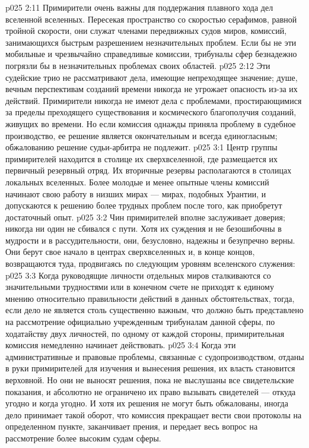 \vs p025 2:11 \pc Примирители очень важны для поддержания плавного хода дел вселенной вселенных. Пересекая пространство со скоростью серафимов, равной тройной скорости, они служат членами передвижных судов миров, комиссий, занимающихся быстрым разрешением незначительных проблем. Если бы не эти мобильные и чрезвычайно справедливые комиссии, трибуналы сфер безнадежно погрязли бы в незначительных проблемах своих областей.
\vs p025 2:12 Эти судейские трио не рассматривают дела, имеющие непреходящее значение; душе, вечным перспективам созданий времени никогда не угрожает опасность из\hyp{}за их действий. Примирители никогда не имеют дела с проблемами, простирающимися за пределы преходящего существования и космического благополучия созданий, живущих во времени. Но если комиссия однажды приняла проблему в судебное производство, ее решение является окончательным и всегда единогласным; обжалованию решение судьи\hyp{}арбитра не подлежит.
\vs p025 3:1 Центр группы примирителей находится в столице их сверхвселенной, где размещается их первичный резервный отряд. Их вторичные резервы располагаются в столицах локальных вселенных. Более молодые и менее опытные члены комиссий начинают свою работу в низших мирах --- мирах, подобных Урантии, и допускаются к решению более трудных проблем после того, как приобретут достаточный опыт.
\vs p025 3:2 Чин примирителей вполне заслуживает доверия; никогда ни один не сбивался с пути. Хотя их суждения и не безошибочны в мудрости и в рассудительности, они, безусловно, надежны и безупречно верны. Они берут свое начало в центрах сверхвселенных и, в конце концов, возвращаются туда, продвигаясь по следующим уровням вселенского служения:
\vs p025 3:3 \pc {}\bibnobreakspace {} Когда руководящие личности отдельных миров сталкиваются со значительными трудностями или в конечном счете не приходят к единому мнению относительно правильности действий в данных обстоятельствах, тогда, если дело не является столь существенно важным, что должно быть представлено на рассмотрение официально учрежденным трибуналам данной сферы, по ходатайству двух личностей, по одному от каждой стороны, примирительная комиссия немедленно начинает действовать.
\vs p025 3:4 Когда эти административные и правовые проблемы, связанные с судопроизводством, отданы в руки примирителей для изучения и вынесения решения, их власть становится верховной. Но они не выносят решения, пока не выслушаны все свидетельские показания, и абсолютно не ограничено их право вызывать свидетелей --- откуда угодно и когда угодно. И хотя их решения не могут быть обжалованы, иногда дело принимает такой оборот, что комиссия прекращает вести свои протоколы на определенном пункте, заканчивает прения, и передает весь вопрос на рассмотрение более высоким судам сферы.
